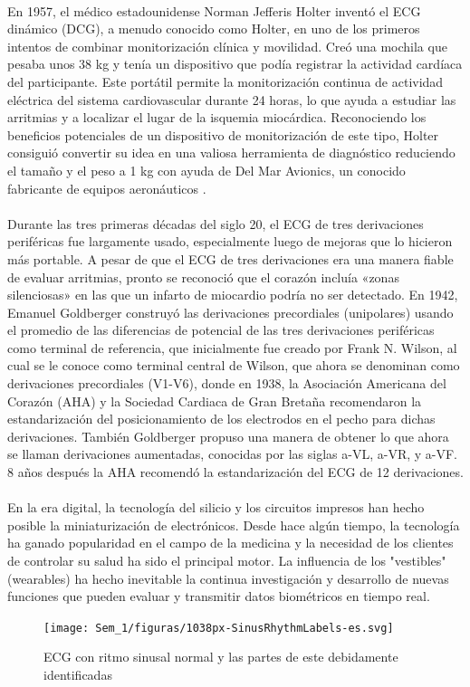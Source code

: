 \documentclass[spanish,11pt,letterpaper,oneside]{memoir}
\begin{document}
    \\
    En 1957, el médico estadounidense Norman Jefferis Holter inventó el ECG dinámico (DCG), a menudo conocido como Holter, en uno de los primeros intentos de combinar monitorización clínica y movilidad. Creó una mochila que pesaba unos 38 kg y tenía un dispositivo que podía registrar la actividad cardíaca del participante. Este portátil permite la monitorización continua de actividad eléctrica del sistema cardiovascular durante 24 horas, lo que ayuda a estudiar las arritmias y a localizar el lugar de la isquemia miocárdica. Reconociendo los beneficios potenciales de un dispositivo de monitorización de este tipo, Holter consiguió convertir su idea en una valiosa herramienta de diagnóstico reduciendo el tamaño y el peso a 1 kg con ayuda de Del Mar Avionics, un conocido fabricante de equipos aeronáuticos \cite{vincent2022}.\\
    \\
    Durante las tres primeras décadas del siglo 20, el ECG de tres derivaciones periféricas fue largamente usado, especialmente luego de mejoras que lo hicieron más portable. A pesar de que el ECG de tres derivaciones era una manera fiable de evaluar arritmias, pronto se reconoció que el corazón incluía «zonas silenciosas» en las que un infarto de miocardio podría no ser detectado. En 1942, Emanuel Goldberger construyó las derivaciones precordiales (unipolares) usando el promedio de las diferencias de potencial de las tres derivaciones periféricas como terminal de referencia, que inicialmente fue creado por Frank N. Wilson, al cual se le conoce como terminal central de Wilson, que ahora se denominan como derivaciones precordiales (V1-V6), donde en 1938, la Asociación Americana del Corazón (AHA) y la Sociedad Cardiaca de Gran Bretaña recomendaron la estandarización del posicionamiento de los electrodos en el pecho para dichas derivaciones. También Goldberger propuso una manera de obtener lo que ahora se llaman derivaciones aumentadas, conocidas por las siglas a-VL, a-VR, y a-VF. 8 años después la AHA recomendó la estandarización del ECG de 12 derivaciones. \cite{vincent2022}\\
    \\
    En la era digital, la tecnología del silicio y los circuitos impresos han hecho posible la miniaturización de electrónicos. Desde hace algún tiempo, la tecnología ha ganado popularidad en el campo de la medicina y la necesidad de los clientes de controlar su salud ha sido el principal motor. La influencia de los "vestibles" (wearables) ha hecho inevitable la continua investigación y desarrollo de nuevas funciones que pueden evaluar y transmitir datos biométricos en tiempo real. \\ 
    \begin{figure}[h]
    	\centering
    	\texttt{[image: Sem\_1/figuras/1038px-SinusRhythmLabels-es.svg]}
    	\caption{ECG con ritmo sinusal normal y las partes de este debidamente identificadas}
    	\label{fig:ECGSinusal}
    \end{figure}
    \\
    
\end{document}
